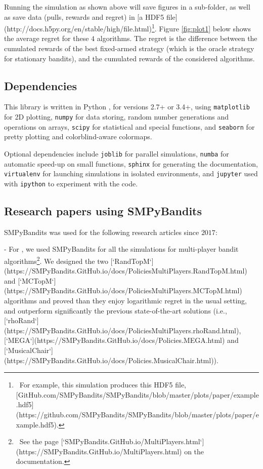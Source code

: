 Running the simulation as shown above will save figures in a sub-folder, as well as save data (pulls, rewards and regret) in [a HDF5 file](http://docs.h5py.org/en/stable/high/file.html)\footnote{~For example, this simulation produces this HDF5 file, [GitHub.com/SMPyBandits/SMPyBandits/blob/master/plots/paper/example.hdf5](https://github.com/SMPyBandits/SMPyBandits/blob/master/plots/paper/example.hdf5).}.
Figure \ref{fig:plot1} below shows the average regret for these $4$ algorithms.
The regret is the difference between the cumulated rewards of the best fixed-armed strategy (which is the oracle strategy for stationary bandits), and the cumulated rewards of the considered algorithms.



\subsection{Dependencies}

This library is written in Python \cite{python}, for versions 2.7+ or 3.4+, using \texttt{matplotlib} \cite{matplotlib} for 2D plotting, \texttt{numpy} \cite{numpy} for data storing, random number generations and operations on arrays, \texttt{scipy} \cite{scipy} for statistical and special functions, and \texttt{seaborn} \cite{seaborn} for pretty plotting and colorblind-aware colormaps.

Optional dependencies include \texttt{joblib} \cite{joblib} for parallel simulations, \texttt{numba} \cite{numba} for automatic speed-up on small functions, \texttt{sphinx} \cite{sphinx} for generating the documentation, \texttt{virtualenv} \cite{virtualenv} for launching simulations in isolated environments, and \texttt{jupyter} \cite{jupyter} used with \texttt{ipython} \cite{ipython} to experiment with the code.


\subsection{Research papers using SMPyBandits}

SMPyBandits was used for the following research articles since $2017$:

- For \cite{Besson2018ALT}, we used SMPyBandits for all the simulations for multi-player bandit algorithms\footnote{~See the page [`SMPyBandits.GitHub.io/MultiPlayers.html`](https://SMPyBandits.GitHub.io/MultiPlayers.html) on the documentation.}. We designed the two [`RandTopM`](https://SMPyBandits.GitHub.io/docs/PoliciesMultiPlayers.RandTopM.html) and [`MCTopM`](https://SMPyBandits.GitHub.io/docs/PoliciesMultiPlayers.MCTopM.html) algorithms and proved than they enjoy logarithmic regret in the usual setting, and outperform significantly the previous state-of-the-art solutions (i.e., [`rhoRand`](https://SMPyBandits.GitHub.io/docs/PoliciesMultiPlayers.rhoRand.html), [`MEGA`](https://SMPyBandits.GitHub.io/docs/Policies.MEGA.html) and [`MusicalChair`](https://SMPyBandits.GitHub.io/docs/Policies.MusicalChair.html)).

